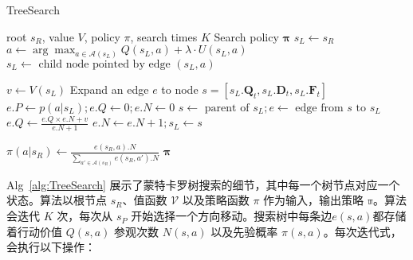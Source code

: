 \begin{algorithm}[!htbp]
\caption{TreeSearch}\label{alg:TreeSearch}
\renewcommand{\algorithmicrequire}{\textbf{Input:}}
\renewcommand{\algorithmicensure}{\textbf{Output:}}
\begin{algorithmic}[1]
\Require root $s_R$, value $V$, policy $\pi$, search times $K$
\Ensure Search policy $\mathbf{\pi}$
\State $s_L\leftarrow s_R$
  \State $a \leftarrow \arg\max_{a\in\mathcal{A}(s_L)} Q(s_L, a) +\lambda \cdot U(s_L, a)$
  \State $s_L \leftarrow \textrm{ child node pointed by edge }(s_L, a)$
\EndWhile

    \State $v\leftarrow V(s_L)$ 
    \State Expand an edge $e$ to node $ s = [s_L.\mathbf{Q}_t, s_L.\mathbf{D}_t, s_L.\mathbf{F}_t]$
    \State $e.P \leftarrow p(a|s_L); e.Q \leftarrow 0; e.N \leftarrow  0$
  \EndFor
{}
  \State $s \leftarrow \textrm{ parent of }s_L; e \leftarrow \textrm{ edge from }s\textrm{ to }s_L$
  \State $e.Q \leftarrow \frac{e.Q\times e.N + v}{e.N + 1}$
  \State $e.N \leftarrow e.N + 1; s_L \leftarrow s$
\EndWhile
\EndFor

  \State $\pi(a|s_R)\leftarrow \frac{e(s_R, a).N}{\sum_{a'\in\mathcal{A}(s_R)}e(s_R, a').N}$
\EndFor
\Return $\mathbf{\pi}$
\end{algorithmic}
\end{algorithm}

Alg~\ref{alg:TreeSearch} 展示了蒙特卡罗树搜索的细节，其中每一个树节点对应一个状态。算法以根节点 $s_R$、值函数 $\mathcal{V}$ 以及策略函数 $\pi$ 作为输入，输出策略 $\mathbb{\pi}$。算法会迭代 $K$ 次，每次从 $s_P$ 开始选择一个方向移动。搜索树中每条边$e(s,a)$都存储着行动价值 $Q(s,a)$ 参观次数 $N(s,a)$ 以及先验概率 $\pi(s,a)$。每次迭代式，会执行以下操作：

